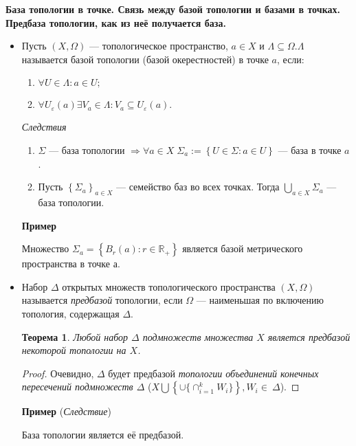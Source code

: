\documentclass[a4paper,100pt]{article}
\theoremstyle{indented}
\newtheorem{theorem}{Теорема}
\begin{document}
\textbf{База топологии в точке. Связь между базой топологии и базами в точках. Предбаза топологии, как из неё получается база.}\\
    \begin{itemize}
    \item 
    Пусть $\left(X, \Omega\right)$ --- топологическое пространство, $a \in X$ и $\Lambda \subseteq \Omega. \Lambda$ называется базой топологии (базой окерестностей) в точке $a$, если:
    \begin{enumerate}
        \item $\forall U \in \Lambda: a \in U;$ 
        \item $\forall U_\varepsilon (a) \exists V_a \in \Lambda: V_a \subseteq U_\varepsilon (a).$
    \end{enumerate}
    
    \textit{Следствия}
    
    \begin{enumerate}
        \item $\Sigma$ --- база топологии $\Rightarrow \forall a \in X \; \Sigma_a := \left\{ U \in \Sigma: a \in U \right\}$ --- база в точке $a$. 
        \item Пусть $\left\{ \Sigma_a\right\}_{a \in X}$ --- семейство баз во всех точках. Тогда $\bigcup_{a \in X} \Sigma_a$ --- база топологии.
    \end{enumerate}
    
    \textbf{Пример}
    
    Множество $\Sigma_a = \left\{B_r(a): r \in \mathbb R_+ \right\}$ является базой метрического пространства в точке а.
    \item
    Набор $\Delta$ открытых множеств топологического пространства $\left(X, \Omega \right)$ называется \textit{предбазой} \hypertarget{n18}{топологии}, если $\Omega$ --- наименьшая по включению топология, содержащая $\Delta$.
    
    \begin{theorem}
        Любой набор $\Delta$ подмножеств множества $X$ является предбазой некоторой топологии на $X$.
    \end{theorem}
    \begin{proof}
    
         Очевидно, $\Delta$ будет предбазой \textit{топологии объединений конечных пересечений подмножеств $\Delta$} ($X \bigcup \left\{ \cup\{\cap_{i=1}^k W_i\}\right\}, W_i\in~ \Delta$).
    \end{proof}
    \textbf{Пример} (\textit{Следствие})
    
    База топологии является её предбазой.
    \end{itemize}
\end{document}
